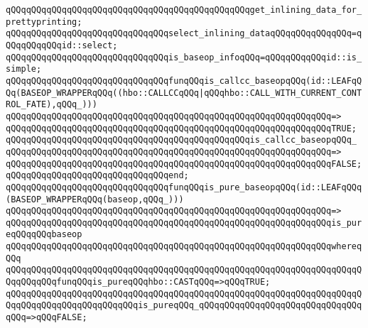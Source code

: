 \verb|qQQqqQQqqQQqqQQqqQQqqQQqqQQqqQQqqQQqqQQqqQQqqQQqget_inlining_data_for_prettyprinting;|\newline
\newline
\verb|qQQqqQQqqQQqqQQqqQQqqQQqqQQqqQQqselect_inlining_dataqQQqqQQqqQQqqQQq=qQQqqQQqqQQqid::select;|\newline
\newline
\verb|qQQqqQQqqQQqqQQqqQQqqQQqqQQqqQQqis_baseop_infoqQQq=qQQqqQQqqQQqid::is_simple;|\newline
\newline
\newline
\verb|qQQqqQQqqQQqqQQqqQQqqQQqqQQqqQQqfunqQQqis_callcc_baseopqQQq(id::LEAFqQQq(BASEOP_WRAPPERqQQq((hbo::CALLCCqQQq|\verb#|qQQqhbo::CALL_WITH_CURRENT_CONTROL_FATE),qQQq_)))#\newline
\verb|qQQqqQQqqQQqqQQqqQQqqQQqqQQqqQQqqQQqqQQqqQQqqQQqqQQqqQQqqQQqqQQq=>|\newline
\verb|qQQqqQQqqQQqqQQqqQQqqQQqqQQqqQQqqQQqqQQqqQQqqQQqqQQqqQQqqQQqqQQqTRUE;|\newline
\newline
\verb|qQQqqQQqqQQqqQQqqQQqqQQqqQQqqQQqqQQqqQQqqQQqqQQqis_callcc_baseopqQQq_|\newline
\verb|qQQqqQQqqQQqqQQqqQQqqQQqqQQqqQQqqQQqqQQqqQQqqQQqqQQqqQQqqQQqqQQq=>|\newline
\verb|qQQqqQQqqQQqqQQqqQQqqQQqqQQqqQQqqQQqqQQqqQQqqQQqqQQqqQQqqQQqqQQqFALSE;|\newline
\verb|qQQqqQQqqQQqqQQqqQQqqQQqqQQqqQQqend;|\newline
\newline
\newline
\verb|qQQqqQQqqQQqqQQqqQQqqQQqqQQqqQQqfunqQQqis_pure_baseopqQQq(id::LEAFqQQq(BASEOP_WRAPPERqQQq(baseop,qQQq_)))|\newline
\verb|qQQqqQQqqQQqqQQqqQQqqQQqqQQqqQQqqQQqqQQqqQQqqQQqqQQqqQQqqQQqqQQq=>|\newline
\verb|qQQqqQQqqQQqqQQqqQQqqQQqqQQqqQQqqQQqqQQqqQQqqQQqqQQqqQQqqQQqqQQqis_pureqQQqqQQqbaseop|\newline
\verb|qQQqqQQqqQQqqQQqqQQqqQQqqQQqqQQqqQQqqQQqqQQqqQQqqQQqqQQqqQQqqQQqwhereqQQq|\newline
\verb|qQQqqQQqqQQqqQQqqQQqqQQqqQQqqQQqqQQqqQQqqQQqqQQqqQQqqQQqqQQqqQQqqQQqqQQqqQQqqQQqfunqQQqis_pureqQQqhbo::CASTqQQq=>qQQqTRUE;|\newline
\verb|qQQqqQQqqQQqqQQqqQQqqQQqqQQqqQQqqQQqqQQqqQQqqQQqqQQqqQQqqQQqqQQqqQQqqQQqqQQqqQQqqQQqqQQqqQQqqQQqis_pureqQQq_qQQqqQQqqQQqqQQqqQQqqQQqqQQqqQQqqQQq=>qQQqFALSE;|\newline
